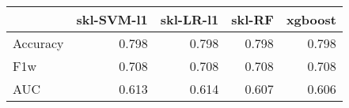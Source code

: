 \begin{tabular}{lrrrr}
\toprule
{} &  skl-SVM-l1 &  skl-LR-l1 &  skl-RF &  xgboost \\
\midrule
Accuracy &       0.798 &      0.798 &   0.798 &    0.798 \\
F1w      &       0.708 &      0.708 &   0.708 &    0.708 \\
AUC      &       0.613 &      0.614 &   0.607 &    0.606 \\
\bottomrule
\end{tabular}
